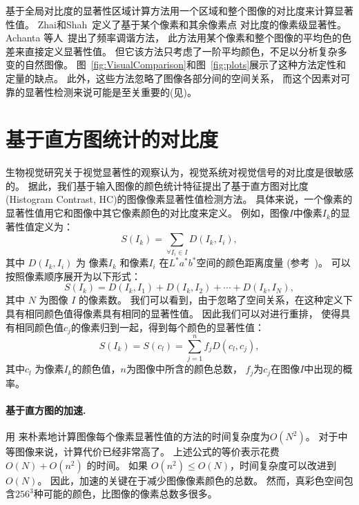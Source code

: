 \documentclass[final]{cvpr}
\newcommand{\Lab}{$L^*a^*b^*$}
\newcommand{\mypara}[1]{\paragraph{#1.}}
\begin{document}
基于全局对比度的显著性区域计算方法用一个区域和整个图像的对比度来计算显著性值。
Zhai和Shah~\cite{06acmmm/ZhaiS_spatiotemporal}定义了基于某个像素和其余像素点
对比度的像素级显著性。
Achanta 等人~\cite{09cvpr/Achanta_FTSaliency}提出了频率调谐方法，
此方法用某个像素和整个图像的平均色的色差来直接定义显著性值。
但它该方法只考虑了一阶平均颜色，不足以分析复杂多变的自然图像。
图~\ref{fig:VisualComparison}和图~\ref{fig:plots}展示了这种方法定性和定量的缺点。
此外，这些方法忽略了图像各部分间的空间关系，
而这个因素对可靠的显著性检测来说可能是至关重要的(见)。


\section{基于直方图统计的对比度}\label{sec:HC}

生物视觉研究关于视觉显著性的观察认为，视觉系统对视觉信号的对比度是很敏感的。
据此，我们基于输入图像的颜色统计特征提出了基于直方图对比度
(Histogram Contrast, HC)的图像像素显著性值检测方法。
具体来说，一个像素的显著性值用它和图像中其它像素颜色的对比度来定义。
例如，图像$I$中像素$I_k$的显著性值定义为：
\begin{equation}\label{equ:PixelColorContrast}
    S(I_k) = \sum_{\forall I_i \in I} D(I_k, I_i),
\end{equation}
其中 $D(I_k, I_i)$ 为 像素$I_k$ 和像素$I_i$ 在\Lab 空间的颜色距离度量
(参考~\cite{06acmmm/ZhaiS_spatiotemporal})。
 可以按照像素顺序展开为以下形式：
\begin{equation}\label{equ:PixelCCPixelOrder}
    S(I_k) = D(I_k, I_1) + D(I_k, I_2) + \cdots + D(I_k, I_N),
\end{equation}
其中 $N$ 为图像 $I$ 的像素数。
我们可以看到，由于忽略了空间关系，在这种定义下具有相同颜色值得像素具有相同的显著性值。
因此我们可以对进行重排，
使得具有相同颜色值$c_j$的像素归到一起，得到每个颜色的显著性值：
\begin{equation}\label{equ:PixelCCColorOrder}
    S(I_k) = S(c_l) = \sum_{j=1}^{n}{f_j D(c_l, c_j)},
\end{equation}
其中$c_l$ 为像素$I_k$的颜色值，$n$为图像中所含的颜色总数，
$f_j$为$c_j$在图像$I$中出现的概率。


\mypara{基于直方图的加速}用
来朴素地计算图像每个像素显著性值的方法的时间复杂度为$O(N^2)$。
对于中等图像来说，计算代价已经非常高了。
上述公式的等价表示花费$O(N) + O(n^2)$ 的时间。
如果 $O(n^2) \leq O(N)$，时间复杂度可以改进到$O(N)$。
因此，加速的关键在于减少图像像素颜色的总数。
然而，真彩色空间包含$256^3$种可能的颜色，比图像的像素总数多很多。
\end{document}

